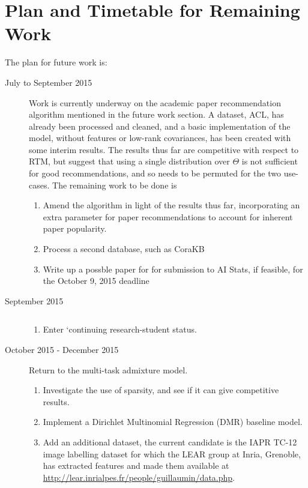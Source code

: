 

\section{Plan and Timetable for Remaining Work}

The plan for future work is:
\begin{description}
\item[July to September 2015] $\text{ } $\\
Work is currently underway on the academic paper recommendation algorithm mentioned in the future work section. A dataset, ACL, has already been processed and cleaned, and a basic implementation of the model, without features or low-rank covariances, has been created with some interim results. The results thus far are competitive with respect to RTM, but suggest that using a single distribution over $\Theta$ is not sufficient for good recommendations, and so needs to be permuted for the two use-cases. The remaining work to be done is
\begin{enumerate}
    \item Amend the algorithm in light of the results thus far, incorporating an extra parameter for paper recommendations to account for inherent paper popularity.
    \item Process a second database, such as CoraKB
    \item Write up a possble paper for for submission to AI Stats, if feasible, for the October 9, 2015 deadline
\end{enumerate}
\item[September 2015] $\text{ } $\\
\begin{enumerate}
    \item Enter `continuing research-student status.
\end{enumerate}
\item[October 2015 - December 2015] $\text{ } $\\
Return to the multi-task admixture model. 
\begin{enumerate}
    \item Investigate the use of sparsity, and see if it can give competitive results. 
    \item Implement a Dirichlet Multinomial Regression (DMR) baseline model. 
    \item Add an additional dataset, the current candidate is the IAPR TC-12 image labelling dataset for which the LEAR group at Inria, Grenoble, has extracted features and made them available at \url{http://lear.inrialpes.fr/people/guillaumin/data.php}.

\end{enumerate}
\end{description}

